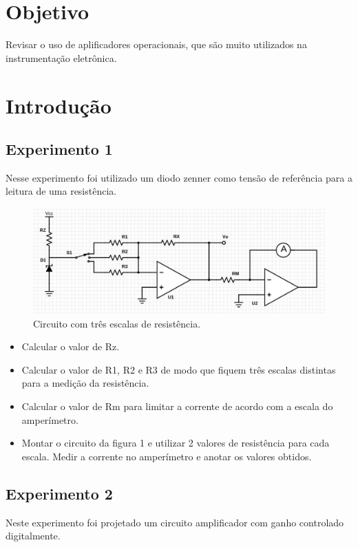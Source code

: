 \newpage

\section{Objetivo}
Revisar o uso de aplificadores operacionais, que são muito utilizados na instrumentação eletrônica.

\section{Introdução}

\subsection{Experimento 1}
Nesse experimento foi utilizado um diodo zenner como tensão de referência para a leitura de uma resistência.

\begin{figure}[H]
\begin{center}
\includegraphics[scale=.25]{Imagens/cir1.jpg}
\caption{Circuito com três escalas de resistência.}
\label{cir1}
\end{center}
\end{figure}

\begin{itemize}
 \item Calcular o valor de Rz.
 \item Calcular o valor de R1, R2 e R3 de modo que fiquem três escalas distintas para a medição da resistência.
 \item Calcular o valor de Rm para limitar a corrente de acordo com a escala do amperímetro.
 \item Montar o circuito da figura 1 e utilizar 2 valores de resistência para cada escala. Medir a corrente no amperímetro e anotar os valores obtidos.
 \end{itemize} 
 
 \subsection{Experimento 2}
Neste experimento foi projetado um circuito amplificador com ganho controlado digitalmente. 
 
